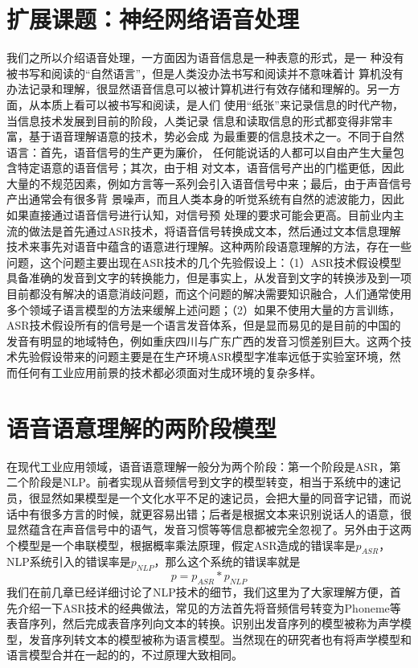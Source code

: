 \documentclass[twoside,a4paper,12pt]{book}%
\begin{document}
\section{扩展课题：神经网络语音处理}

我们之所以介绍语音处理，一方面因为语音信息是一种表意的形式，是一
种没有被书写和阅读的“自然语言”，但是人类没办法书写和阅读并不意味着计
算机没有办法记录和理解，很显然语音信息可以被计算机进行有效存储和理解的。另一方面，从本质上看可以被书写和阅读，是人们
使用“纸张”来记录信息的时代产物，当信息技术发展到目前的阶段，人类记录
信息和读取信息的形式都变得非常丰富，基于语音理解语意的技术，势必会成
为最重要的信息技术之一。不同于自然语言：首先，语音信号的生产更为廉价，
任何能说话的人都可以自由产生大量包含特定语意的语音信号；其次，由于相
对文本，语音信号产出的门槛更低，因此大量的不规范因素，例如方言等一系列会引入语音信号中来；最后，由于声音信号产出通常会有很多背
景噪声，而且人类本身的听觉系统有自然的滤波能力，因此如果直接通过语音信号进行认知，对信号预
处理的要求可能会更高。目前业内主流的做法是首先通过ASR技术，将语音信号转换成文本，然后通过文本信息理解技术来事先对语音中蕴含的语意进行理解。这种两阶段语意理解的方法，存在一些问题，这个问题主要出现在ASR技术的几个先验假设上：（1）ASR技术假设模型具备准确的发音到文字的转换能力，但是事实上，从发音到文字的转换涉及到一项目前都没有解决的语意消歧问题，而这个问题的解决需要知识融合，人们通常使用多个领域子语言模型的方法来缓解上述问题；（2）如果不使用大量的方言训练，ASR技术假设所有的信号是一个语言发音体系，但是显而易见的是目前的中国的发音有明显的地域特色，例如重庆四川与广东广西的发音习惯差别巨大。这两个技术先验假设带来的问题主要是在生产环境ASR模型字准率远低于实验室环境，然而任何有工业应用前景的技术都必须面对生成环境的复杂多样。

\section{语音语意理解的两阶段模型}
在现代工业应用领域，语音语意理解一般分为两个阶段：第一个阶段是ASR，第二个阶段是NLP。前者实现从音频信号到文字的模型转变，相当于系统中的速记员，很显然如果模型是一个文化水平不足的速记员，会把大量的同音字记错，而说话中有很多方言的时候，就更容易出错；后者是根据文本来识别说话人的语意，很显然蕴含在声音信号中的语气，发音习惯等等信息都被完全忽视了。另外由于这两个模型是一个串联模型，根据概率乘法原理，假定ASR造成的错误率是$p_{ASR}$，NLP系统引入的错误率是$p_{NLP}$，那么这个系统的错误率就是
$$
p=p_{ASR}*p_{NLP}
$$
我们在前几章已经详细讨论了NLP技术的细节，我们这里为了大家理解方便，首先介绍一下ASR技术的经典做法，常见的方法首先将音频信号转变为Phoneme等表音序列，然后完成表音序列向文本的转换。识别出发音序列的模型被称为声学模型，发音序列转文本的模型被称为语言模型。当然现在的研究者也有将声学模型和语言模型合并在一起的的，不过原理大致相同。
\end{document}
